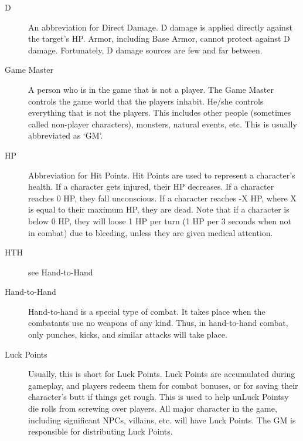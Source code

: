 \documentclass[twoside]{book}
\begin{document}
\begin{description}
{    }
  
  \item[ D ] 
    {  
     An abbreviation for Direct Damage. D damage is
                 applied directly against the target's HP. Armor,
                 including Base Armor, cannot protect against D damage.
                 Fortunately, D damage sources are few and far between.
                 
    }
  
  \item[ Game Master ] 
    {  
     A person who is in the game that is not a player.
                 The Game Master controls the game world that the players
                 inhabit. He/she controls everything that is not the
                 players. This includes other people (sometimes called
                 non-player characters), monsters, natural events, etc.
                 This is usually abbreviated as `GM'. 
    }
  
  \item[ HP ] 
    {  
     Abbreviation for Hit Points. Hit Points are used
                 to represent a character's health. If a character
                 gets injured, their HP decreases. If a character reaches
                 0 HP, they fall unconscious. If a character reaches -X
                 HP, where X is equal to their maximum HP, they are dead.
                 Note that if a character is below 0 HP, they will loose
                 1 HP per turn (1 HP per 3 seconds when not in combat)
                 due to bleeding, unless they are given medical
                 attention. 
    }
  
  \item[ HTH ] 
    {  
     see Hand-to-Hand 
    }
  
  \item[ Hand-to-Hand ] 
    {  
     Hand-to-hand is a special type of combat. It
                 takes place when the combatants use no weapons of any
                 kind. Thus, in hand-to-hand combat, only punches, kicks,
                 and similar attacks will take place. 
    }
  
  \item[ Luck Points ] 
    {  
     Usually, this is short for Luck Points. Luck
                 Points are accumulated during gameplay, and players
                 redeem them for combat bonuses, or for saving their
                 character's butt if things get rough. This is used
                 to help unLuck Pointsy die rolls from screwing over
                 players. All major character in the game, including
                 significant NPCs, villains, etc. will have Luck Points.
                 The GM is responsible for distributing Luck Points.
                 
}
\end{description}
\end{document}
